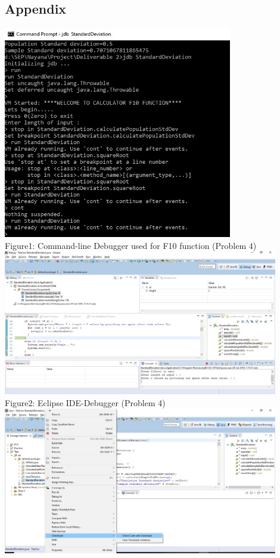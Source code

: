 \documentclass[a4paper,12pt]{article}
\begin{document}
\begin{titlepage}
\section{Appendix}
\includegraphics[width=10.0cm]{JDBDebugger.jpg}\\
Figure1: Command-line Debugger used for F10 function (Problem 4) \\
\newline
\newline
\includegraphics[width=12.0cm]{IDE-SC.jpg}\\
Figure2: Eclipse IDE-Debugger (Problem 4)\\
\newline
\newline
\includegraphics[width=12.0cm]{Checkstyle.jpg}\\

\end{titlepage}
\end{document}
